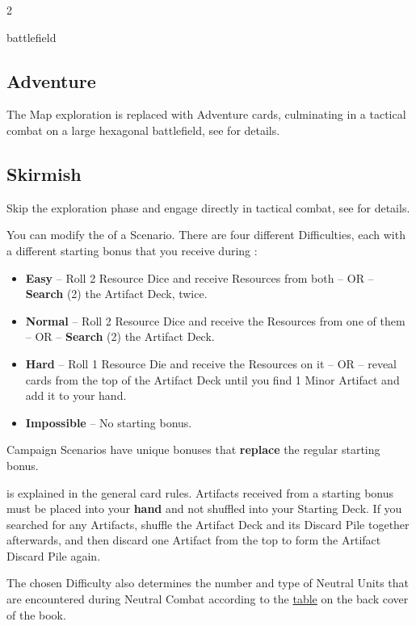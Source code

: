 \begin{multicols*}{2}
\begin{expansion}[before=\vspace*{-10mm}]{battlefield}
  \subsection*{Adventure}
  The Map exploration is replaced with Adventure cards, culminating in a tactical combat on a large hexagonal battlefield, see  for details.

  \subsection*{Skirmish}
  Skip the exploration phase and engage directly in tactical combat, see  for details.
\end{expansion}

\vspace*{1em}

You can modify the  of a Scenario.
There are four different Difficulties, each with a different starting bonus that you receive during :
\begin{itemize}
  \item \textbf{Easy} – Roll 2 Resource Dice  and receive Resources from both – OR – \textbf{Search} (2) the Artifact Deck, twice.
  \item \textbf{Normal} – Roll 2 Resource Dice  and receive the Resources from one of them – OR – \textbf{Search} (2) the Artifact Deck.
  \item \textbf{Hard} – Roll 1 Resource Die  and receive the Resources on it – OR – reveal cards from the top of the Artifact Deck until you find 1 Minor Artifact and add it to your hand.
  \item \textbf{Impossible} – No starting bonus.
\end{itemize}

Campaign Scenarios have unique bonuses that \textbf{replace} the regular starting bonus.

 is explained in the general card rules.
Artifacts received from a starting bonus must be placed into your \textbf{hand} and not shuffled into your Starting Deck.
If you searched for any Artifacts, shuffle the Artifact Deck and its Discard Pile together afterwards, and then discard one Artifact from the top to form the Artifact Discard Pile again.\par
The chosen Difficulty also determines the number and type of Neutral Units that are encountered during Neutral Combat according to the \hyperlink{Difficulty Table}{table} on the back cover of the book.


\end{multicols*}
